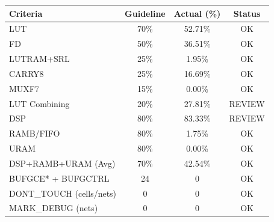 \documentclass{article}
\begin{document}
\begin{table}[H]

    \begin{tabular}{|l|c|c|c|}
    \hline
    \textbf{Criteria}                                                  & \textbf{Guideline} & \textbf{Actual (\%)} & \textbf{Status} \\ \hline
    LUT                                                               & 70\%               & 52.71\%              & OK              \\ \hline
    FD                                                                & 50\%               & 36.51\%              & OK              \\ \hline
    LUTRAM+SRL                                                        & 25\%               & 1.95\%               & OK              \\ \hline
    CARRY8                                                            & 25\%               & 16.69\%              & OK              \\ \hline
    MUXF7                                                             & 15\%               & 0.00\%               & OK              \\ \hline
    LUT Combining                                                     & 20\%               & 27.81\%              & REVIEW          \\ \hline
    DSP                                                               & 80\%               & 83.33\%              & REVIEW          \\ \hline
    RAMB/FIFO                                                         & 80\%               & 1.75\%               & OK              \\ \hline
    URAM                                                              & 80\%               & 0.00\%               & OK              \\ \hline
    DSP+RAMB+URAM (Avg)                                               & 70\%               & 42.54\%              & OK              \\ \hline
    BUFGCE* + BUFGCTRL                                                & 24                 & 0                    & OK              \\ \hline
    DONT\_TOUCH (cells/nets)                                          & 0                  & 0                    & OK              \\ \hline
    MARK\_DEBUG (nets)                                                & 0                  & 0                    & OK              \\ \hline

\end{tabular}
\end{table}
\end{document}
